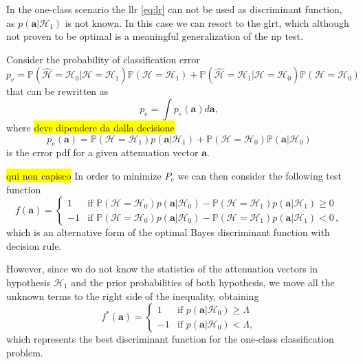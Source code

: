 \documentclass[draftcls,onecolumn,12pt]{IEEEtran}
\begin{document}
In the one-class scenario the \ac{llr} \eqref{eq:lr} can not be used as discriminant function, as $p(\bm{a}|\mathcal{H}_1)$ is not known. In this case we can resort to the \ac{glrt}, which although not proven to be optimal is a meaningful generalization of the \ac{np} test.

Consider the probability of classification error
\begin{equation}
    p_e = {\mathbb P}\left(\hat{\mathcal H} = \mathcal{H}_0|{\mathcal H} = \mathcal{H}_1 \right){\mathbb P}\left({\mathcal H}=  \mathcal{H}_1\right)+{\mathbb P}\left(\hat{\mathcal H} = \mathcal{H}_1|{\mathcal H} = \mathcal{H}_0 \right){\mathbb P}\left( {\mathcal H} = \mathcal{H}_0\right)
\end{equation}
that can be rewritten as
\begin{equation}
   p_e = \int p_e(\bm{a}) d\bm{a}, 
\end{equation}
where \colorbox{yellow}{deve dipendere da dalla decisione}
\begin{equation}\label{eq: disc}
    p_e(\bm{a}) = {\mathbb P}\left( \mathcal{H}=\mathcal{H}_1\right)p\left(\bm{a}|\mathcal{H}_1\right)+{\mathbb P}\left(\mathcal{H}= \mathcal{H}_0\right){\mathbb P}\left(\bm{a}|\mathcal{H}_0\right)
\end{equation}
is the error \ac{pdf} for a given attenuation vector $\bm{a}$.

\colorbox{yellow}{qui non capisco}
In order to minimize $P_e$ we can then consider the following test function
\begin{equation}
f(\bm{a})=    \begin{cases}
    1 & \text{if }  {\mathbb P}\left( \mathcal{H}= \mathcal{H}_0\right)p\left(\bm{a}|\mathcal{H}_0\right)- {\mathbb P}\left( \mathcal{H}=\mathcal{H}_1\right)p\left(\bm{a}|\mathcal{H}_1\right) \geq 0 \\
-1 & \text{if }
 {\mathbb P}\left( \mathcal{H}= \mathcal{H}_0\right)p\left(\bm{a}|\mathcal{H}_0\right)- {\mathbb P}\left( \mathcal{H}= \mathcal{H}_1\right)p\left(\bm{a}|\mathcal{H}_1\right) < 0\,,
    \end{cases}
\end{equation}
which is an alternative form of the optimal Bayes discriminant function with decision rule.


However, since we do not know the statistics of the attenuation vectors in hypothesis $\mathcal{H}_1$ and the prior probabilities of both hypothesis, we move all the unknown terms to the right side of the inequality, obtaining  
\begin{equation}
\label{eq:oneClassDec}
f^*(\bm{a}) =
\begin{cases}
1 &\text{if } p(\bm{a}|\mathcal{H}_0) \geq \Lambda \\
-1 & \text{if } p(\bm{a}|\mathcal{H}_0) < \Lambda,
\end{cases}
\end{equation}
which represents the best discriminant function for the one-class classification problem.
\end{document}
